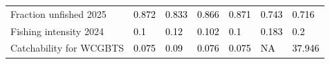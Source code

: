 \documentclass[
  english,
]{article}
\begin{document}
\begin{landscape}
\begin{longtable}[t]{ll>{\raggedright\arraybackslash}p{5em}>{\raggedright\arraybackslash}p{5em}>{\raggedright\arraybackslash}p{5em}>{\raggedright\arraybackslash}p{5em}>{\raggedright\arraybackslash}p{5em}}
\hspace{1em}Fraction unfished 2025 & \textcolor{black}{0.872} & \textcolor{black}{0.833} & \textcolor{black}{0.866} & \textcolor{black}{0.871} & \textcolor{black}{0.743} & \textcolor{black}{0.716}\\
\hspace{1em}Fishing intensity 2024 & \textcolor{black}{0.1} & \textcolor{black}{0.12} & \textcolor{black}{0.102} & \textcolor{black}{0.1} & \textcolor{black}{0.183} & \textcolor{black}{0.2}\\
\hspace{1em}Catchability for WCGBTS & \textcolor{black}{0.075} & \textcolor{black}{0.09} & \textcolor{black}{0.076} & \textcolor{black}{0.075} & \textcolor{black}{NA} & \textcolor{black}{37.946}\\
\bottomrule

\end{longtable}

\endgroup{}


\end{landscape}

\newpage{}
\end{document}
